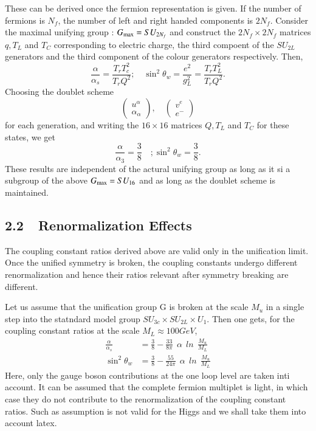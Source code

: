 These can be derived once the fermion representation is given. If the number of fermions is $N_{f}$, the number of left and right handed components is $2N_{f}$. Consider the maximal unifying group : $G_{\rm max} =SU_{2N_{f}}$ and construct the $2N_{f} \times 2N_{f}$ matrices $q, T_{L}$ and $T_{C}$ corresponding to electric charge, the third compoent of the $SU_{2L}$ generators and the third component of the colour generators respectively. Then,
$$
\frac{\alpha}{\alpha_{s}} = \frac{T_{r} T_{c}^{2}}{T_{r} Q^{2}} ; \quad \sin^{2} \theta_{w} = \frac{e^{2}}{g^{2}_{L}} = \frac{T_{r} T_{L}^{2}}{T_{r} Q^{2}}.
$$
Choosing the doublet scheme
\begin{equation*}
\begin{pmatrix}
u^{\alpha} \\ \alpha_{\alpha}
\end{pmatrix}
, \quad 
\begin{pmatrix}
v^{e} \\ e^{-}
\end{pmatrix}
\end{equation*}
for each generation, and writing the $16 \times 16$ matrices $Q, T_{L}$ and $T_{C}$ for these states, we get
$$
\frac{\alpha}{\alpha_{3}} = \frac{3}{8}\quad ; \sin^{2} \theta_{w} = \frac{3}{8}.
$$
These results are independent of the actural unifying group as long as it si a subgroup of the above $G_{\rm max} = SU_{16}$ and as long as the doublet scheme is maintained.

\subsection{2.2~~Renormalization Effects}\label{subsec-2.2}

The coupling constant ratios derived above are valid only in the unification limit. Once the unified symmetry is broken, the coupling constants undergo different renormalization and hence their ratios relevant after symmetry breaking are different.

Let us assume that the unification group G is broken at the scale $M_{u}$ in a single step into the statndard model group $SU_{3c} \times SU_{2L} \times U_{1}$. Then one gets, for the coupling constant ratios at the scale $M_{L} \approx 100 GeV$,
\begin{align*}
\frac{\alpha}{ \alpha_{s}} &= \frac{3}{8} - \frac{33}{8 \pi}~~ \alpha~~ ln~~ \frac{M_{u}}{M_{L}}\\
\sin^{2}\theta_{w} & = \frac{3}{8} - \frac{55}{24 \pi}~~ \alpha~~ ln~~ \frac{M_{u}}{M_{L}}
\end{align*}
Here, only the gauge boson contributions at the one loop level are taken inti account. It can be assumed that the complete fermion multiplet is light, in which case they do not contribute to the renormalization of the coupling constant ratios. Such as assumption is not valid for the Higgs and we shall take them into account latex.

